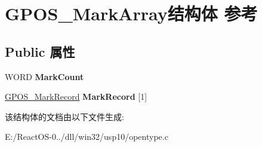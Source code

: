 \hypertarget{struct_g_p_o_s___mark_array}{}\section{G\+P\+O\+S\+\_\+\+Mark\+Array结构体 参考}
\label{struct_g_p_o_s___mark_array}
\subsection*{Public 属性}
\begin{DoxyCompactItemize}
\item 
\mbox{\label{struct_g_p_o_s___mark_array_aba9ab45f8ec981a53696038b2a277875}} 
W\+O\+RD {\bfseries Mark\+Count}
\item 
\mbox{\label{struct_g_p_o_s___mark_array_a1bed579b057f8ebd805f196168306c62}} 
\hyperlink{struct_g_p_o_s___mark_record}{G\+P\+O\+S\+\_\+\+Mark\+Record} {\bfseries Mark\+Record} \mbox{[}1\mbox{]}
\end{DoxyCompactItemize}


该结构体的文档由以下文件生成\+:\begin{DoxyCompactItemize}
\item 
E\+:/\+React\+O\+S-\/0../dll/win32/usp10/opentype.\+c\end{DoxyCompactItemize}

